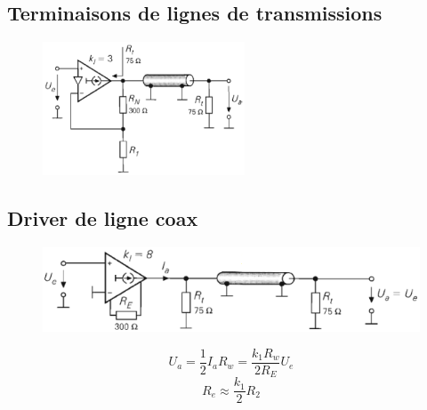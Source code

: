 \documentclass[resume]{subfiles}
\begin{document}
\begin{multicols}{3}
\subsection{Terminaisons de lignes de transmissions}
\begin{figure}[H]
\centering
\includegraphics[width=6.00cm]{img_77.png}
\end{figure}
\subsection{Driver de ligne coax}
\begin{figure}[H]
\centering
\includegraphics[width=\columnwidth]{img_55.png}
\end{figure}
$$U_a=\frac{1}{2}I_aR_w=\frac{k_1R_w}{2R_E}U_e$$
$$R_e\approx\frac{k_1}{2}R_2$$
\end{multicols}
\end{document}
